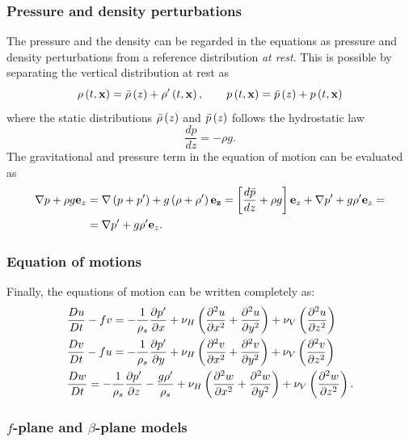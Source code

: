 \subsubsection*{Pressure and density perturbations}
The pressure and the density can be regarded in the equations as pressure and density perturbations from a reference distribution \textit{at rest}. This is possible by separating the vertical distribution at rest as
\begin{equation}\label{perturbations}
\rho\left( t,\mathbf{x} \right)=\bar{\rho}\left( z \right)+\rho'\left( t,\mathbf{x} \right), \qquad p\left( t,\mathbf{x} \right)=\bar{p}\left( z \right)+p\left( t,\mathbf{x} \right)
\end{equation}
where the static distributions $\bar{\rho}\left( z \right)$ and $\bar{p}\left( z \right)$ follows the hydrostatic law
\begin{equation}
\dfrac{dp}{dz}=-\rho g.
\end{equation}
The gravitational and pressure term in the equation of motion can be evaluated as
\begin{align*}
\nabla p +\rho g \mathbf{e}_{z}&=\nabla\left( p+p' \right)+g\left( \rho+\rho' \right)\mathbf{e_{z}}=\left[ \dfrac{d\bar{p}}{dz}+\rho g \right]\mathbf{e}_{z}+\nabla p' +g\rho'\mathbf{e}_{z}=\\
&=\nabla p' + g\rho' \mathbf{e}_{z}.
\end{align*}
\subsubsection*{Equation of motions}
Finally, the equations of motion can be written completely as:
\begin{align}
&\dfrac{Du}{Dt}-fv=-\dfrac{1}{\rho_{s}}\dfrac{\partial p'}{\partial x}+\nu_{H}\left( \dfrac{\partial^{2} u}{\partial x^{2}}+\dfrac{\partial^{2} u}{\partial y^{2}} \right)+\nu_{V}\left( \dfrac{\partial^{2} u}{\partial z^{2}} \right)\\
&\dfrac{Dv}{Dt}-fu=-\dfrac{1}{\rho_{s}}\dfrac{\partial p'}{\partial y}+\nu_{H}\left( \dfrac{\partial^{2} v}{\partial x^{2}}+\dfrac{\partial^{2} v}{\partial y^{2}} \right)+\nu_{V}\left( \dfrac{\partial^{2} v}{\partial z^{2}} \right)\\
&\dfrac{Dw}{Dt}=-\dfrac{1}{\rho_{s}}\dfrac{\partial p'}{\partial z}-\dfrac{g\rho'}{\rho_{s}}+\nu_{H}\left( \dfrac{\partial^{2} w}{\partial x^{2}}+\dfrac{\partial^{2} w}{\partial y^{2}} \right)+\nu_{V}\left( \dfrac{\partial^{2} w}{\partial z^{2}} \right).
\end{align}
\subsubsection*{$f$-plane and $\beta$-plane models}
